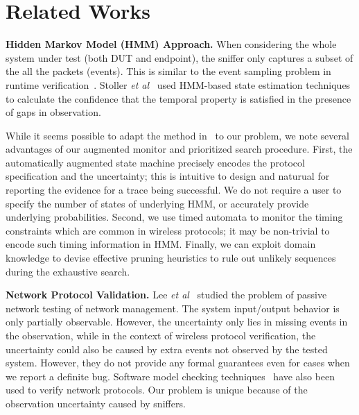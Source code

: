 \section{Related Works}
\label{sec:related}

\textbf{Hidden Markov Model (HMM) Approach.} When considering the whole system
under test (both DUT and endpoint), the sniffer only captures a subset of the
all the packets (events).  This is similar to the event sampling problem in
runtime
verification~\cite{bonakdarpour2011sampling,hauswirth2004low,arnold2008qvm,fei2006artemis}.
Stoller \textit{et al}~\cite{stoller2011runtime} used HMM-based state estimation
techniques to calculate the confidence that the temporal property is satisfied
in the presence of gaps in observation.

While it seems possible to adapt the
method in~\cite{stoller2011runtime} to our problem, we note several advantages
of our augmented monitor and prioritized search procedure.  First, the
automatically augmented state machine precisely encodes the protocol
specification and the uncertainty; this is intuitive to design and naturual for
reporting the evidence for a trace being successful.  We do not require a user
to specify the number of states of underlying HMM, or accurately provide
underlying probabilities.  Second, we use timed automata to monitor the timing
constraints which are common in wireless protocols; it may be non-trivial to
encode such timing information in HMM.  Finally, we can exploit domain knowledge
to devise effective pruning heuristics to rule out unlikely sequences during the
exhaustive search. 

\textbf{Network Protocol Validation.} Lee \textit{et al}~\cite{lee1997passive}
studied the problem of passive network testing of network management. The system
input/output behavior is only partially observable. However, the uncertainty
only lies in missing events in the observation, while in the context of wireless
protocol verification, the uncertainty could also be caused by extra events not
observed by the tested system.  However, they do not provide any formal
guarantees even for cases when we report a definite bug.  Software model
checking techniques~\cite{musuvathi2002cmc,godefroid1997model} have also been
used to verify network protocols. Our problem is unique because of the
observation uncertainty caused by sniffers.

